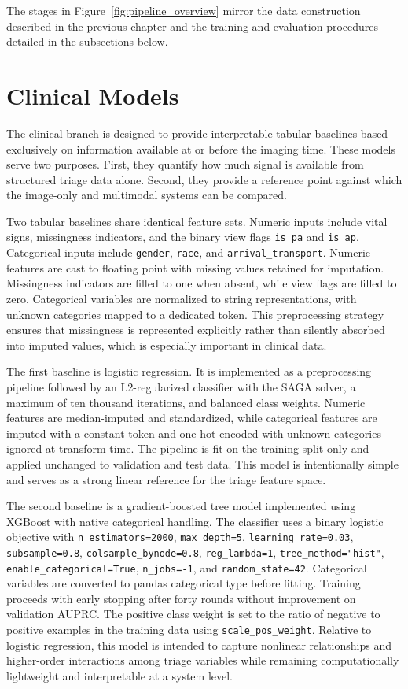 The stages in Figure~\ref{fig:pipeline_overview} mirror the data construction described in the previous chapter and the training and evaluation procedures detailed in the subsections below.

\section{Clinical Models}

The clinical branch is designed to provide interpretable tabular baselines based exclusively on information available at or before the imaging time. These models serve two purposes. First, they quantify how much signal is available from structured triage data alone. Second, they provide a reference point against which the image-only and multimodal systems can be compared.

Two tabular baselines share identical feature sets. Numeric inputs include vital signs, missingness indicators, and the binary view flags \texttt{is\_pa} and \texttt{is\_ap}. Categorical inputs include \texttt{gender}, \texttt{race}, and \texttt{arrival\_transport}. Numeric features are cast to floating point with missing values retained for imputation. Missingness indicators are filled to one when absent, while view flags are filled to zero. Categorical variables are normalized to string representations, with unknown categories mapped to a dedicated token. This preprocessing strategy ensures that missingness is represented explicitly rather than silently absorbed into imputed values, which is especially important in clinical data.

The first baseline is logistic regression. It is implemented as a preprocessing pipeline followed by an L2-regularized classifier with the SAGA solver, a maximum of ten thousand iterations, and balanced class weights. Numeric features are median-imputed and standardized, while categorical features are imputed with a constant token and one-hot encoded with unknown categories ignored at transform time. The pipeline is fit on the training split only and applied unchanged to validation and test data. This model is intentionally simple and serves as a strong linear reference for the triage feature space.

The second baseline is a gradient-boosted tree model implemented using XGBoost with native categorical handling. The classifier uses a binary logistic objective with \texttt{n\_estimators=2000}, \texttt{max\_depth=5}, \texttt{learning\_rate=0.03}, \texttt{subsample=0.8}, \texttt{colsample\_bynode=0.8}, \texttt{reg\_lambda=1}, \texttt{tree\_method="hist"}, \texttt{enable\_categorical=True}, \texttt{n\_jobs=-1}, and \texttt{random\_state=42}. Categorical variables are converted to pandas categorical type before fitting. Training proceeds with early stopping after forty rounds without improvement on validation AUPRC. The positive class weight is set to the ratio of negative to positive examples in the training data using \texttt{scale\_pos\_weight}. Relative to logistic regression, this model is intended to capture nonlinear relationships and higher-order interactions among triage variables while remaining computationally lightweight and interpretable at a system level.

